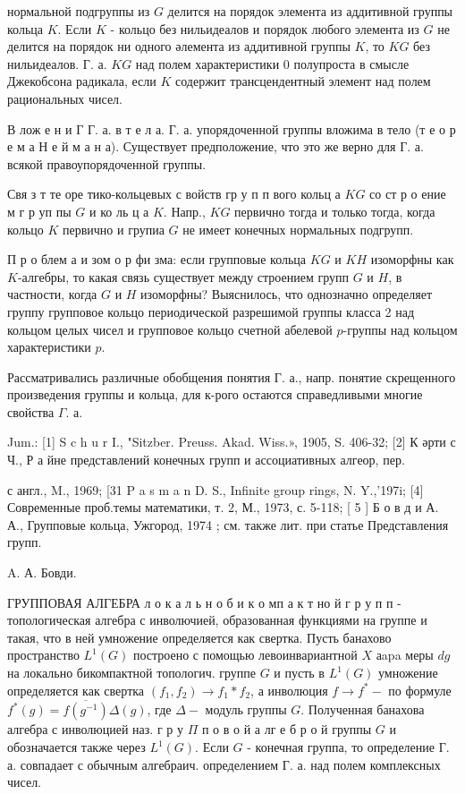 \documentclass[10pt]{article}
\begin{document}
нормальной подгруппы из $G$ делится на порядок элемента из аддитивной группы кольца $K$. Если $K$ - кольцо без нильидеалов и порядок любого элемента из $G$ не делится на порядок ни одного әлемента из аддитивной группы $K$, то $K G$ без нильидеалов. $Г$. а. $K G$ над полем характеристики 0 полупроста в смысле Джекобсона радикала, если $K$ содержит трансцендентный элемент над полем рациональных чисел.



В лож е н и Г Г. а. в т е л а. Г. а. упорядоченной группы вложима в тело (т е о р е м а Н е й м а н а). Существует предположение, что это же верно для Г. а. всякой правоупорядоченной группы.



Свя з т те оре тико-кольцевых с войств гр у п п вого кольц а $K G$ со ст р о ение м г р уп пы $G$ и ко ль ц а $K$. Напр., $K G$ первично тогда и только тогда, когда кольцо $K$ первично и групиа $G$ не имеет конечных нормальных подгрупп.



П р о блем а и зом о р фи зма: если групповые кольца $K G$ и $K H$ изоморфны как $K$-алгебры, то какая связь существует между строением групп $G$ и $H$, в частности, когда $G$ и $H$ изоморфны? Выяснилось, что однозначно определяет группу групповое кольцо периодической разрешимой группы класса 2 над кольцом целых чисел и групповое кольцо счетной абелевой $p$-группы над кольцом характеристики $p$.



Рассматривались различные обобщения понятия Г. а., напр. понятие скрещенного произведения группы и кольца, для к-рого остаются справедливыми многие свойства $\Gamma$. а.



Jum.: [1] S c h u r I., "Sitzber. Preuss. Akad. Wiss.», 1905, S. 406-32; [2] К әрти с Ч., Р а йне представлений конечных групп и ассоциативных алгеор, пер.

с англ., M., 1969; [31 P a s m a n D. S., Infinite group rings, N. Y.,'197i; [4] Современные проб.темы математики, т. 2, М., 1973, с. 5-118; [ 5 ] Б о в д и А. А., Групповые кольца, Ужгород, 1974 ; см. также лит. при статье Представления групп.



A. А. Бовди.



ГРУППОВАЯ АЛГЕБРА л о к а л ь н о б и к о мп а к т но й г р у п п - топологическая алгебра с инволючией, образованная функциями на группе и такая, что в ней умножение определяется как свертка. Пусть банахово пространство $L^{\mathrm{1}}(G)$ построено с помощью левоинвариантной $X$ аapa меры $d g$ на локально бикомпактной топологич. группе $G$ и пусть в $L^{1}(G)$ умножение определяется как свертка $\left(f_{1}, f_{2}\right) \rightarrow f_{1} * f_{2}$, а инволюция $f \rightarrow f^{*}-$ по формуле $f^{*}(g)=\overline{f\left(g^{-1}\right)} \Delta(g)$, где $\Delta-$ модуль группы $G$. Полученная банахова алгебра с инволюцией наз. $г$ р у $\Pi$ п о в о й а лг е б р о й группы $G$ и обозначается также через $L^{1}(G)$. Если $G$ - конечная группа, то определение Г. а. совпадает с обычным алгебраич. определением Г. а. над полем комплексных чисел.
\end{document}

